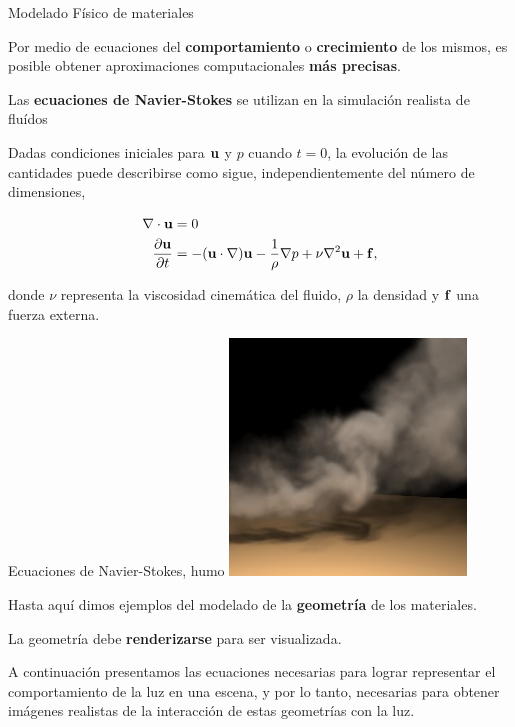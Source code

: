 \documentclass[spanish]{beamer}
\begin{document}
\begin{frame}{Modelado Físico de materiales}

Por medio de ecuaciones del \textbf{comportamiento} o \textbf{crecimiento} de los mismos, es posible obtener aproximaciones computacionales \textbf{más precisas}.

Las \textbf{ecuaciones de Navier-Stokes} se utilizan en la simulación realista de fluídos

Dadas condiciones iniciales para $\bold{u}$ y $p$ cuando $t = 0$, la evolución de las cantidades puede describirse como sigue, independientemente del número de dimensiones,

\begin{align*}
\nabla \cdot \bold{u} &= 0\\
\frac{\partial \bold{u} }{\partial t} &= - (\bold{u} \cdot \nabla) \bold{u} - \frac{1}{\rho} \nabla p + \nu \nabla^{2} \bold{u} + \bold{f},
\end{align*}

\noindent donde $\nu$ representa la viscosidad cinemática del fluido, $\rho$ la densidad y $\bold{f}$ una fuerza externa.

\end{frame}

\begin{frame}{Ecuaciones de Navier-Stokes, humo}
\center
\includegraphics[width=6.3cm]{../figures/smoke}

\end{frame}

\begin{frame}

Hasta aquí dimos ejemplos del modelado de la \textbf{geometría} de los materiales.

\vspace{0.5cm}
La geometría debe \textbf{renderizarse} para ser visualizada.
\vspace{0.5cm}

A continuación presentamos las ecuaciones necesarias para lograr representar el comportamiento de la luz en una escena, y por lo tanto, necesarias para obtener imágenes realistas de la interacción de estas geometrías con la luz.

\end{frame}
\end{document}
